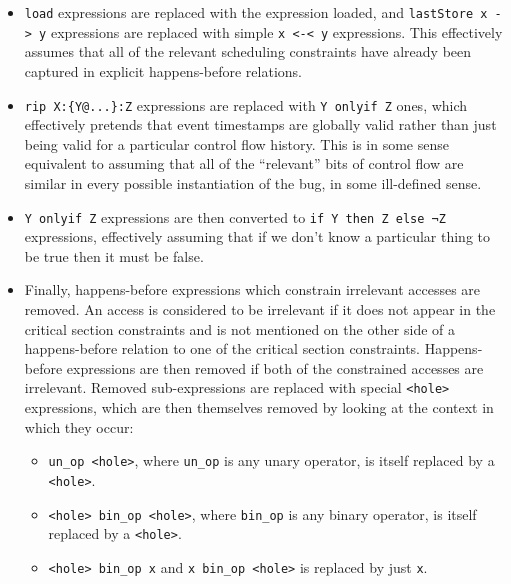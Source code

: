 \documentclass[10pt,a4paper]{report}
\begin{document}
\begin{itemize}
\item \verb|load| expressions are replaced with the expression loaded,
  and \verb|lastStore x -> y| expressions are replaced with simple
  \verb|x <-< y| expressions.  This effectively assumes that all of
  the relevant scheduling constraints have already been captured in
  explicit happens-before relations.

\item \verb|rip X:{Y@...}:Z| expressions are replaced with
  \verb|Y onlyif Z| ones, which effectively pretends that event
  timestamps are globally valid rather than just being valid for a
  particular control flow history.  This is in some sense equivalent
  to assuming that all of the ``relevant'' bits of control flow are
  similar in every possible instantiation of the bug, in some
  ill-defined sense.

\item \verb|Y onlyif Z| expressions are then converted to
  \verb|if Y then Z else ¬Z| expressions, effectively assuming that if
  we don't know a particular thing to be true then it must be false.

\item Finally, happens-before expressions which constrain irrelevant
  accesses are removed.  An access is considered to be irrelevant if
  it does not appear in the critical section constraints and is not
  mentioned on the other side of a happens-before relation to one of
  the critical section constraints.  Happens-before expressions are
  then removed if both of the constrained accesses are irrelevant.
  Removed sub-expressions are replaced with special \verb|<hole>|
  expressions, which are then themselves removed by looking at the
  context in which they occur:

  \begin{itemize}
  \item \verb|un_op <hole>|, where \verb|un_op| is any unary operator,
    is itself replaced by a \verb|<hole>|.
  \item \verb|<hole> bin_op <hole>|, where \verb|bin_op| is any binary
    operator, is itself replaced by a \verb|<hole>|.
  \item \verb|<hole> bin_op x| and \verb|x bin_op <hole>| is replaced
    by just \verb|x|.
  \end{itemize}


\end{itemize}
\end{document}
